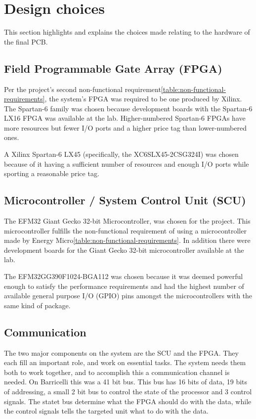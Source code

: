 \section{Design choices} 
This section highlights and explains the choices made relating to the hardware of the final PCB.

\subsection{Field Programmable Gate Array (FPGA)} \label{pcb:design-choices:ss:fpga}
Per the project's second non-functional requirement\vref{table:non-functional-requirements}, the system's FPGA was required to be one produced by Xilinx.
The Spartan-6 family was chosen because development boards with the Spartan-6 LX16 FPGA was available at the lab.
Higher-numbered Spartan-6 FPGAs have more resources but fewer I/O ports and a higher price tag than lower-numbered ones.

A Xilinx Spartan-6 LX45 (specifically, the XC6SLX45-2CSG324I) was chosen because of it having a sufficient number of resources and enough I/O ports while sporting a reasonable price tag.


\subsection{Microcontroller / System Control Unit (SCU)} \label{pcb:design-choices:ss:scu}
The EFM32 Giant Gecko 32-bit Microcontroller, was chosen for the project.
This microcontroller fulfills the non-functional requirement of using a microcontroller made by Energy Micro\vref{table:non-functional-requirements}.
In addition there were development boards for the Giant Gecko 32-bit microcontroller available at the lab.

The EFM32GG390F1024-BGA112 was chosen because it was deemed powerful enough to satisfy the performance requirements and had the highest number of available general purpose I/O (GPIO) pins amongst the microcontrollers with the same kind of package.


\subsection{Communication} \label{pcb:design-choices:ss:internal_communication}
The two major components on the system are the SCU and the FPGA.
They each fill an important role, and work on essential tasks.
The system needs them both to work together, and to accomplish this a communication channel is needed.
On Barricelli this was a 41 bit bus.
This bus has 16 bits of data, 19 bits of addressing, a small 2 bit bus to control the state of the processor and 3 control signals.
The statet bus determine what the FPGA should do with the data, while the control signals tells the targeted unit what to do with the data. 


